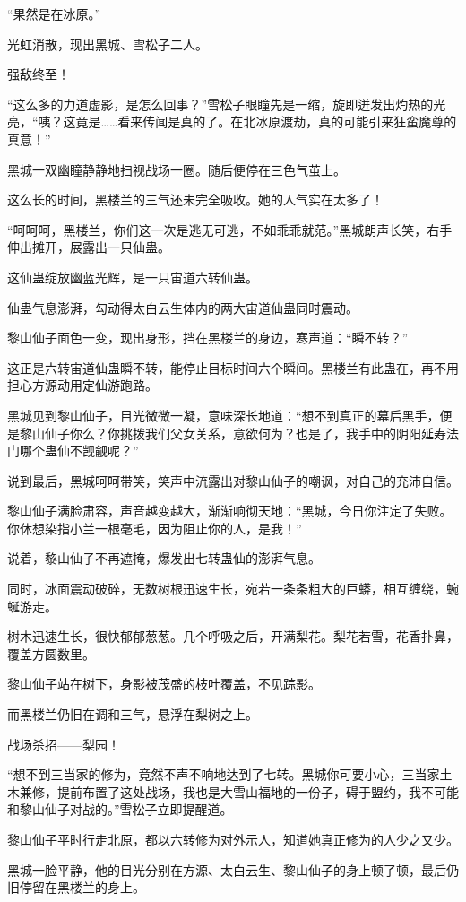 \begin{this_body}
“果然是在冰原。”

光虹消散，现出黑城、雪松子二人。

强敌终至！

“这么多的力道虚影，是怎么回事？”雪松子眼瞳先是一缩，旋即迸发出灼热的光亮，“咦？这竟是……看来传闻是真的了。在北冰原渡劫，真的可能引来狂蛮魔尊的真意！”

黑城一双幽瞳静静地扫视战场一圈。随后便停在三色气茧上。

这么长的时间，黑楼兰的三气还未完全吸收。她的人气实在太多了！

“呵呵呵，黑楼兰，你们这一次是逃无可逃，不如乖乖就范。”黑城朗声长笑，右手伸出摊开，展露出一只仙蛊。

这仙蛊绽放幽蓝光辉，是一只宙道六转仙蛊。

仙蛊气息澎湃，勾动得太白云生体内的两大宙道仙蛊同时震动。

黎山仙子面色一变，现出身形，挡在黑楼兰的身边，寒声道：“瞬不转？”

这正是六转宙道仙蛊瞬不转，能停止目标时间六个瞬间。黑楼兰有此蛊在，再不用担心方源动用定仙游跑路。

黑城见到黎山仙子，目光微微一凝，意味深长地道：“想不到真正的幕后黑手，便是黎山仙子你么？你挑拨我们父女关系，意欲何为？也是了，我手中的阴阳延寿法门哪个蛊仙不觊觎呢？”

说到最后，黑城呵呵带笑，笑声中流露出对黎山仙子的嘲讽，对自己的充沛自信。

黎山仙子满脸肃容，声音越变越大，渐渐响彻天地：“黑城，今日你注定了失败。你休想染指小兰一根毫毛，因为阻止你的人，是我！”

说着，黎山仙子不再遮掩，爆发出七转蛊仙的澎湃气息。

同时，冰面震动破碎，无数树根迅速生长，宛若一条条粗大的巨蟒，相互缠绕，蜿蜒游走。

树木迅速生长，很快郁郁葱葱。几个呼吸之后，开满梨花。梨花若雪，花香扑鼻，覆盖方圆数里。

黎山仙子站在树下，身影被茂盛的枝叶覆盖，不见踪影。

而黑楼兰仍旧在调和三气，悬浮在梨树之上。

战场杀招——梨园！

“想不到三当家的修为，竟然不声不响地达到了七转。黑城你可要小心，三当家土木兼修，提前布置了这处战场，我也是大雪山福地的一份子，碍于盟约，我不可能和黎山仙子对战的。”雪松子立即提醒道。

黎山仙子平时行走北原，都以六转修为对外示人，知道她真正修为的人少之又少。

黑城一脸平静，他的目光分别在方源、太白云生、黎山仙子的身上顿了顿，最后仍旧停留在黑楼兰的身上。


\end{this_body}
